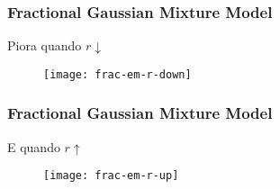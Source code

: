 \begin{frame}
\frametitle{Fractional Gaussian Mixture Model}
\begin{description}
    \item Piora quando $r \downarrow$
\end{description}

\begin{figure}[ht]
    \centering
    \texttt{[image: frac-em-r-down]}
\end{figure}
\end{frame}

\begin{frame}
\frametitle{Fractional Gaussian Mixture Model}
\begin{description}
    \item E quando $r \uparrow$
\end{description}

\begin{figure}[ht]
    \centering
    \texttt{[image: frac-em-r-up]}
\end{figure}
\end{frame}